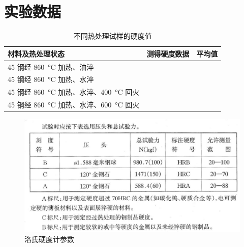 \documentclass[a4paper,utf8]{article}
\begin{document}
\section{实验数据}
\begin{table}[!ht]\centering
    \caption{不同热处理试样的硬度值}
    \extrarowheight=11pt
    \begin{tabularx}{\textwidth}{|m{10em}|*{8}{X|}}\hline
        \hfil 材料及热处理状态 \hfil & \multicolumn{6}{c|}{测得硬度数据} & \multicolumn{2}{c|}{平均值} \\[10pt] \hline
        45 钢经 \SI{860}{\degreeCelsius} 加热、油淬 & \multicolumn{2}{c|}{} & \multicolumn{2}{c|}{} & \multicolumn{2}{c|}{} & \multicolumn{2}{c|}{} \\[14pt] \hline
        45 钢经 \SI{860}{\degreeCelsius} 加热、水淬 & \multicolumn{2}{c|}{} & \multicolumn{2}{c|}{} & \multicolumn{2}{c|}{} & \multicolumn{2}{c|}{} \\[14pt] \hline
        45 钢经 \SI{860}{\degreeCelsius} 加热、水淬、\SI{400}{\degreeCelsius} 回火 &  &  &  &  &  &  &  & \\[14pt] \hline
        45 钢经 \SI{860}{\degreeCelsius} 加热、水淬、\SI{600}{\degreeCelsius} 回火 &  &  &  &  &  &  &  & \\[14pt] \hline
    \end{tabularx}
\end{table}
\begin{figure}[!ht]
    \caption{洛氏硬度计参数}
    \includegraphics[width=\textwidth]{yingdu.jpg}
\end{figure}
\end{document}
